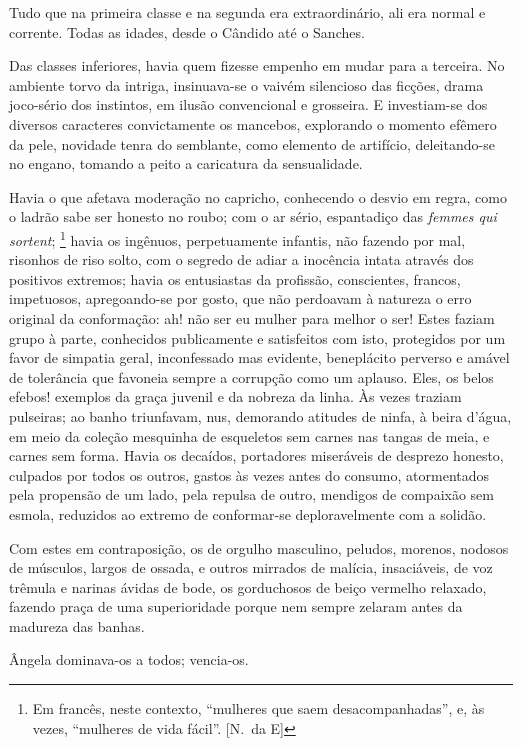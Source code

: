 Tudo que na primeira classe e na segunda era
extraordinário, ali era normal e corrente. Todas as idades, desde o
Cândido até o Sanches. 

Das classes inferiores, havia quem fizesse
empenho em mudar para a terceira. No ambiente torvo da intriga,
insinuava{}-se o vaivém silencioso das ficções, drama joco{}-sério dos
instintos, em ilusão convencional e grosseira. E investiam{}-se dos
diversos caracteres convictamente os mancebos, explorando o momento
efêmero da pele, novidade tenra do semblante, como elemento de
artifício, deleitando{}-se no engano, tomando a peito a caricatura da
sensualidade. 

Havia o que afetava moderação no capricho, conhecendo o
desvio em regra, como o ladrão sabe ser honesto no roubo; com o ar
sério, espantadiço das \textit{femmes qui sortent};
\footnote{ Em francês, neste contexto, ``mulheres que saem desacompanhadas'', 
e, às vezes, ``mulheres de vida fácil''. [N.~da E]} havia os ingênuos,
perpetuamente infantis, não fazendo por mal, risonhos de riso solto,
com o segredo de adiar a inocência intata através dos positivos
extremos; havia os entusiastas da profissão, conscientes, francos,
impetuosos, apregoando{}-se por gosto, que não perdoavam à natureza o
erro original da conformação: ah! não ser eu mulher para melhor o ser!
Estes faziam grupo à parte, conhecidos publicamente e satisfeitos com
isto, protegidos por um favor de simpatia geral, inconfessado mas
evidente, beneplácito perverso e amável de tolerância que favoneia
sempre a corrupção como um aplauso. Eles, os belos efebos! exemplos da
graça juvenil e da nobreza da linha. Às vezes traziam pulseiras; ao
banho triunfavam, nus, demorando atitudes de ninfa, à beira d'água, em
meio da coleção mesquinha de esqueletos sem carnes nas tangas de meia,
e carnes sem forma. Havia os decaídos, portadores miseráveis de
desprezo honesto, culpados por todos os outros, gastos às vezes antes
do consumo, atormentados pela propensão de um lado, pela repulsa de
outro, mendigos de compaixão sem esmola, reduzidos ao extremo de
conformar{}-se deploravelmente com a solidão. 

Com estes em
contraposição, os de orgulho masculino, peludos, morenos, nodosos de
músculos, largos de ossada, e outros mirrados de malícia, insaciáveis,
de voz trêmula e narinas ávidas de bode, os gorduchosos de beiço
vermelho relaxado, fazendo praça de uma superioridade porque nem sempre
zelaram antes da madureza das banhas. 

Ângela dominava{}-os a todos; vencia{}-os. 

